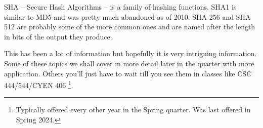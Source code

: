 \documentclass[
  letterpaper,
  DIV=11,
  numbers=noendperiod]{scrartcl}
\newenvironment{Shaded}{\begin{snugshade}}{\end{snugshade}}
\newcommand{\NormalTok}[1]{\textcolor[rgb]{0.00,0.23,0.31}{#1}}
\begin{document}
SHA -- Secure Hash Algorithms -- is a family of hashing functions. SHA1
is similar to MD5 and was pretty much abandoned as of 2010. SHA 256 and
SHA 512 are probably some of the more common ones and are named after
the length in bits of the output they produce.

\begin{Shaded}
\end{Shaded}

This has been a lot of information but hopefully it is very intriguing
information. Some of these topics we shall cover in more detail later in
the quarter with more application. Others you'll just have to wait till
you see them in classes like CSC 444/544/CYEN 406 \footnote{Typically
  offered every other year in the Spring quarter. Was last offered in
  Spring 2024.}.
\end{document}
